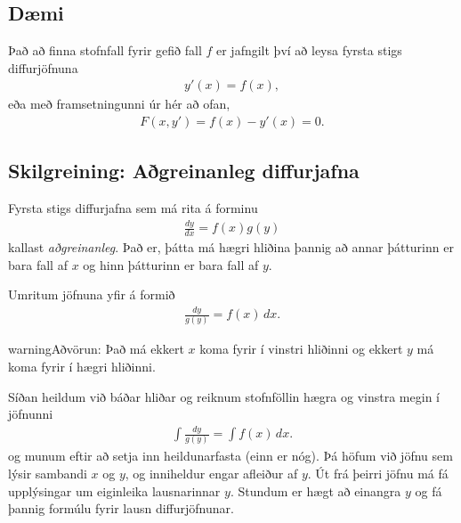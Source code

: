 \documentclass[b5paper,11pt,icelandic]{sphinxmanual}
\begin{document}
\subsection{Dæmi}
\label{kafli08:daemi}
Það að finna stofnfall fyrir gefið fall \(f\) er jafngilt því að leysa
fyrsta stigs diffurjöfnuna
\begin{equation*}
\begin{split}y'(x) = f(x),\end{split}
\end{equation*}
eða með framsetningunni úr {\hyperref[kafli08:diffurjafna]{}} hér
að ofan,
\begin{equation*}
\begin{split}F(x,y') = f(x) - y'(x) = 0.\end{split}
\end{equation*}

\subsection{Skilgreining: Aðgreinanleg diffurjafna}
\label{kafli08:skilgreining-agreinanleg-diffurjafna}\label{kafli08:index-1}
Fyrsta stigs diffurjafna sem má rita á forminu
\begin{equation*}
\begin{split}\frac{dy}{dx}=f(x)g(y)\end{split}
\end{equation*}
kallast \emph{aðgreinanleg}. Það er, þátta má hægri hliðina
þannig að annar þátturinn er bara fall af \(x\) og hinn þátturinn er
bara fall af \(y\).

Umritum jöfnuna yfir á formið
\begin{equation*}
\begin{split}\frac{dy}{g(y)}=f(x)\,dx.\end{split}
\end{equation*}
\begin{notice}{warning}{Aðvörun:}
Það má ekkert \(x\) koma fyrir í vinstri hliðinni og
ekkert \(y\) má koma fyrir í hægri hliðinni.
\end{notice}

Síðan heildum við báðar hliðar og reiknum stofnföllin hægra og vinstra
megin í jöfnunni
\begin{equation*}
\begin{split}\int\frac{dy}{g(y)}=\int f(x)\,dx.\end{split}
\end{equation*}
og munum eftir að setja inn heildunarfasta (einn er nóg). Þá höfum við
jöfnu sem lýsir sambandi \(x\) og \(y\), og inniheldur engar
afleiður af \(y\). Út frá þeirri jöfnu má fá upplýsingar um
eiginleika lausnarinnar \(y\). Stundum er hægt að einangra \(y\)
og fá þannig formúlu fyrir lausn diffurjöfnunar.
\end{document}
